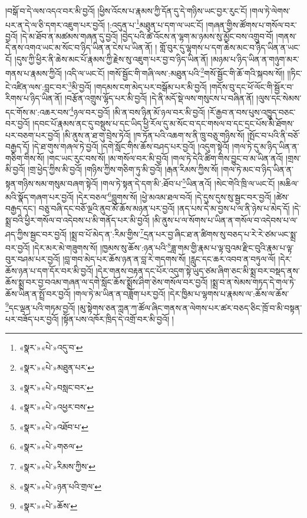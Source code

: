 །བསྒོ་བ་དེ་ལས་འདའ་བར་མི་བྱའོ། །ཕྱིས་འོངས་པ་རྣམས་ཀྱི་དོན་དུ་དེ་གཉིས་ཡང་བྱར་རུང་ངོ། །གལ་ཏེ་ལེགས་པར་ན་དེ་ལ་ཅི་དགར་འཇུག་པར་བྱའོ། །:འདུན་པ་\footnote{«སྣར་»«པེ་»འདུ་བ་}མཐུན་པ་དག་ལ་ཡང་ངོ། །གཞན་གྱིས་ཚོགས་པ་གསོལ་བར་བྱའོ། །དེ་མ་ཐོབ་ན་མཚམས་གཞན་དུ་བྱའོ། །བྱེད་པའི་ཚེ་འོངས་ན་ལྷག་མ་ཉམས་སུ་མྱོང་བས་འགྲུབ་བོ། །གནས་དེ་ནས་འགའ་ཡང་མ་སོང་བ་ཉིད་ཡིན་ན་ངེས་པ་ཡིན་ནོ། །
གློ་བུར་དུ་ལྷགས་པ་དག་ཆེས་མང་བ་ཉིད་ཡིན་ན་ཡང་ངོ། །དུས་ཀྱི་ཕྱིར་ནི་ཆེས་མང་པོ་རྣམས་ཀྱི་རྗེས་སུ་འཇུག་པར་བྱ་བ་ཉིད་ཡིན་ནོ། །མཉམ་པ་ཉིད་ཡིན་ན་གཉུག་མར་གནས་པ་རྣམས་ཀྱིའོ། །འདི་ལ་ཡང་ངོ། །གསོ་སྦྱོང་གི་གཞི་ལས་:མཐུན་པའི་\footnote{«སྣར་»«པེ་»མཐུན་པར་}གསོ་སྦྱོང་གི་ཆོ་གའི་སྐབས་སོ།། །།ཏིང་ངེ་འཛིན་ལས་:བླང་བར་\footnote{«སྣར་»«པེ་»བསླང་བར་}མི་བྱའོ། །གདམས་ངག་མེད་པར་བསྒོམ་པར་མི་བྱའོ། །གདོས་བུ་དང་ཕོ་ལོང་གི་སྦྱོར་བ་རིགས་པ་ཉིད་ཡིན་ནོ། །བརྩོན་འགྲུས་ལྷོད་པར་མི་བྱའོ། །དེ་ནི་མདོ་སྡེ་ལས་གསུངས་པ་བཞིན་ནོ། །ལུས་དང་སེམས་དང་གོས་མ་:འཆར་བས་\footnote{«སྣར་»«པེ་»འཕྱར་བས་}ཉལ་བར་བྱའོ། །མི་ན་བས་ཉིན་མོ་ཉལ་བར་མི་བྱའོ། །རོ་རྒྱབ་ན་བས་པུས་འཁྱུད་བཅང་བར་བྱའོ། །དབང་པོ་རྣམས་ནང་དུ་བསྡུས་པ་དང་ཡིད་ཕྱི་རོལ་དུ་མ་སོང་བ་དང་གསལ་བ་དང་དྲང་པོས་མི་ཐོགས་པར་བཅག་པར་བྱའོ། །མི་ནུས་ན་ཐ་གུ་བྲེས་ཏེའོ། །ཁ་ཏོན་པའི་འཆག་ས་ནི་ཁྲུ་བཅུ་གཉིས་སོ། །སྤོང་བ་པའི་ནི་བཅོ་བརྒྱད་དོ། །དེ་ཐ་གུས་གཞལ་ཏེ་བྱའོ། །དགེ་སློང་གིས་ཆོས་བཤད་པར་བྱའོ། །འདུག་སྟེའོ། །གལ་ཏེ་དུ་མ་ཉིད་ཡིན་ན་གཅིག་གིས་སོ། །གང་ཡང་རུང་བས་སོ། །མ་གསོལ་བར་མི་བྱའོ། །གལ་ཏེ་དེའི་ཚིག་གིས་བྱུང་བ་མ་ཡིན་ནའོ། །གྲས་མི་བྱའོ། །གྲ་ཕྱེད་ཀྱིས་མི་བྱའོ། །གཉིས་ཀྱིས་གཅིག་ཏུ་མི་བྱའོ། །རྒན་རིམས་ཀྱིས་སོ། །གལ་ཏེ་མང་བ་ཉིད་ཡིན་ན་སྟན་གཉིས་སམ་གསུམ་བཞག་སྟེའོ། །གལ་ཏེ་སྟན་དེ་དག་མི་:ཐོབ་པ་\footnote{«སྣར་»«པེ་»འཐོབ་པ་}ཡིན་ནའོ། །སེང་གེའི་ཁྲི་ལ་ཡང་ངོ། །མཆིལ་མའི་སྣོད་གཞག་པར་བྱའོ། །དེར་བཅལ་\footnote{«སྣར་»«པེ་»གཅལ་}བླུགས་སོ། །ཕྱེ་མའམ་ཐལ་བའོ། །དེ་དུས་དུས་སུ་སྦྱང་བར་བྱའོ། །ཚེས་བརྒྱད་དང་། བཅུ་བཞི་དང་བཅོ་ལྔའི་ནུབ་མོ་ཆོས་མཉན་པར་བྱའོ། །ནད་པས་དེ་མ་བྱས་པ་ལ་ནི་ཉེས་པ་མེད་དོ། །དེ་སྨྲ་བའི་ཕྱིར་གསོལ་བ་འདེབས་པ་མི་གནོད་པར་མི་བྱའོ། །མི་ནུས་པ་ལ་སོགས་པ་ཡིན་ན་གསོལ་བ་འདེབས་པ་ལ་ཤད་ཀྱིས་སྦྱང་བར་བྱའོ། །སྨྲ་བ་པོ་མེད་ན་:རིམ་གྱིས་\footnote{«སྣར་»«པེ་»རིམས་ཀྱིས་}དྲན་པར་བྱ་ཞིང་ཐ་ན་ཚིགས་སུ་བཅད་པ་རེ་རེ་ཙམ་ཡང་སྨྲ་བར་བྱའོ། །དེར་མར་མེ་གཟུགས་སོ། །ཁྱམས་སུ་ཆོས་:ཉན་པའི་\footnote{«སྣར་»«པེ་»ཉན་པའི་གྲལ་}ཟླ་གམ་གྱི་རྣམ་པ་ལྟ་བུའམ་རྫིང་བུའི་རྣམ་པ་ལྟ་བུར་བཤམ་པར་བྱའོ། །བླ་གབ་མེད་པར་ཆོས་ཉན་ན་བླ་རེ་གདགས་སོ། །རླུང་དང་ཆར་འབབ་ན་བཏུལ་ལོ། །དེར་ཆོས་ཉན་པ་དག་དོར་བར་མི་བྱའོ། །དེར་གནས་བརྟན་དང་པོར་འདུག་སྟེ་ཡུད་ཙམ་ཞིག་ཅང་མི་སྨྲ་བར་བསྡད་ནས་ཆོས་སྨྲ་བར་བྱ་བའམ་གཞན་ལ་དགེ་སློང་ཆོས་སྨྲོས་ཤིག་ཅེས་གསོལ་བར་བྱའོ། །སྨྲ་བ་ན་སེམས་གཏད་དེ་གལ་ཏེ་ཆོས་ཡིན་ན་སྤྲོ་བར་བྱའོ། །གལ་ཏེ་མ་ཡིན་ན་བཟློག་པར་བྱའོ། །དེར་ཁྱིམ་པ་ལྷགས་པ་རྣམས་ལ་:ཆོས་ལ་ཆོས་\footnote{«སྣར་»«པེ་»ཆོས་}དང་ལྡན་པའི་གཏམ་བྱའོ། །མུ་སྟེགས་ཅན་ཀླན་ཀ་ཚོལ་ཞིང་གནས་ན་ལེགས་པར་ཚར་བཅད་ཅིང་ཁྲོ་བ་མི་བསྟན་པར་བཟོད་པར་བྱའོ། །སྟོན་པས་འཁོར་ཁྲིད་དེ་འགྲོ་བར་མི་བྱའོ། །
